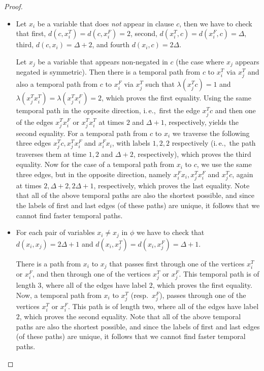 \documentclass[a4paper,UKenglish,cleveref, autoref, thm-restate]{lipics-v2021}
\newcommand{\ie}{i.\,e.,\ }
\begin{document}
\begin{proof}
\begin{itemize}
    \item Let $x_i$ be a variable that does \emph{not} appear in clause $c$, then we have to check that
    first,
    $d(c,x_i^T)=d(c,x_i^F)=2$,
    second, $d(x_i^T, c) = d(x_i^F,c)=\Delta$,
    third, $d(c,x_i)=\Delta + 2$,
    and fourth $d(x_i,c)=2 \Delta$.

    Let $x_j$ be a variable that appears non-negated in $c$ (the case where $x_j$ appears negated is symmetric). 
    Then there is a temporal path 
    from $c$ to $x_i^T$ via $x_j^T$ and also a temporal path 
    from $c$ to $x_i^F$ via $x_j^T$ such that $\lambda(x_j^T c)=1$ and $\lambda(x_j^T x_i^T)=\lambda(x_j^T x_i^F)=2$,
    which proves the first equality.
    Using the same temporal path in the opposite direction,
    \ie first the edge $x_j^T c$ and then one of the edges $x_j^T x_i^F$ or $x_j^T x_i^T$ at times $2$ and $\Delta + 1$, respectively,
    yields the second equality.
    For a temporal path from $c$ to $x_i$ we traverse the following three edges 
    $x_j^T c, x_j^T x_i^F$ and $x_i^Fx_i$,
    with labels $1, 2, 2$ respectively (\ie the path traverses them at time $1,2$ and $\Delta + 2$, respectively), which proves the third equality.
    Now for the case of a temporal path from $x_i$ to $c$,
    we use the same three edges, but in the opposite direction,
    namely $x_i^Fx_i, x_j^T x_i^F$ and $x_j^T c$,
    again at times $2, \Delta + 2, 2\Delta + 1$, respectively,
    which proves the last equality.
    Note that all of the above temporal paths are also the shortest possible, 
    and since the labels of first and last edges (of these paths) are unique,
    it follows that we cannot find faster temporal paths.
    
    \item For each pair of variables $x_i \neq x_j$ in $\phi$ we have to check that
    $d(x_i,x_j)=2\Delta +1$ and
    $d(x_i,x_j^T)=d(x_i,x_j^F)=\Delta + 1$.

    There is a path from $x_i$ to $x_j$ that passes first through one of the vertices 
    $x_i^T$ or $x_i^F$, 
    and then through one of the vertices $x_j^T$ or $x_j^F$.
    This temporal path is of length $3$, where all of the edges have label $2$,
    which proves the first equality.
    Now, a temporal path from $x_i$ to $x_j^T$ (resp.~$x_j^F$),
    passes through one of the vertices $x_i^T$ or $x_i^F$.
    This path is of length two, where all of the edges have label $2$,
    which proves the second equality.
    Note that all of the above temporal paths are also the shortest possible, 
    and since the labels of first and last edges (of these paths) are unique,
    it follows that we cannot find faster temporal paths.
    

\end{itemize}
\end{proof}
\end{document}
